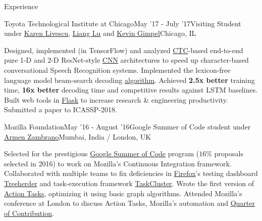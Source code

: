 \documentclass{resume} %
\begin{document}
\vspace*{-1.5mm}
\begin{rSection}{Experience}
\begin{rSubsection}{Toyota Technological Institute at Chicago}{May '17 - July '17}{Visiting Student under \href{http://ttic.uchicago.edu/~klivescu/}{Karen Livescu}, \href{http://ttic.uchicago.edu/~llu/}{Liang Lu} and \href{http://ttic.uchicago.edu/~kgimpel/}{Kevin Gimpel}}{Chicago, IL}
\item Designed, implemented (in TensorFlow) and analyzed \href{https://en.wikipedia.org/wiki/Connectionist_temporal_classification_(CTC)}{CTC}-based end-to-end pure 1-D and 2-D ResNet-style \href{https://en.wikipedia.org/wiki/Convolutional_neural_network}{CNN} architectures to speed up character-based conversational Speech Recognition systems. Implemented the lexicon-free language model beam-search decoding \href{http://deeplearning.stanford.edu/lexfree/lexfree.pdf}{algorithm}. Achieved \textbf{2.5x better} training time, \textbf{16x better} decoding time and competitive results against LSTM baselines. Built web tools in \href{http://flask.pocoo.org/docs/0.12/}{Flask} to increase research \& engineering productivity. Submitted a paper to ICASSP-2018.
\end{rSubsection}
\vspace*{-3mm}
\begin{rSubsection}{Mozilla Foundation}{May '16 - August '16}{Google Summer of Code student under \href{https://github.com/armenzg}{Armen Zambrano}}{Mumbai, India / London, UK}
\item Selected for the prestigious \href{https://en.wikipedia.org/wiki/Google_Summer_of_Code}{Google Summer of Code} program ($16\%$ proposals selected in 2016) to work on Mozilla's Continuous Integration framework. Collaborated with multiple teams to fix deficiencies in \href{https://en.wikipedia.org/wiki/Firefox}{Firefox}'s testing dashboard \href{https://wiki.mozilla.org/EngineeringProductivity/Projects/Treeherder}{Treeherder} and task-execution framework \href{https://docs.taskcluster.net/}{TaskCluster}. Wrote the first version of \href{https://docs.taskcluster.net/manual/using/actions}{Action Tasks}, optimizing it using basic graph algorithms. Attended Mozilla's conference at London to discuss Action Tasks, Mozilla's automation and \href{https://wiki.mozilla.org/Auto-tools/New_Contributor/Quarter_of_Contribution}{Quarter of Contribution}.
\end{rSubsection}
\end{rSection}
\vspace*{-1.5mm}
\end{document}
